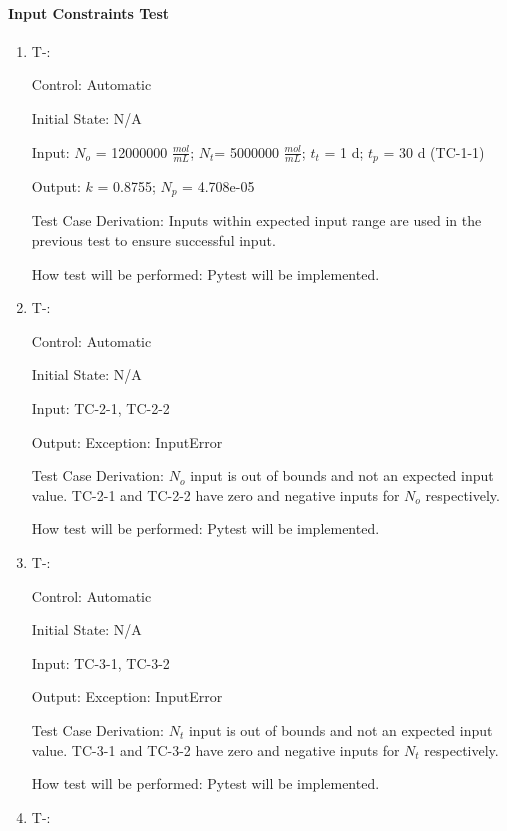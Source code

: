 \documentclass[12pt, titlepage]{article}
\newcounter{tinnum} %
\begin{document}
\paragraph{Input Constraints Test}

\begin{enumerate}

\item{T-}\thetinnum\label{T-1}:

Control: Automatic
					
Initial State: N/A
					
Input: $N_{o}$ = 12000000 $\frac{mol}{mL}$; $N_{t}$= 5000000 $\frac{mol}{mL}$; 
$t_{t}$ = 1 d; $t_{p}$ = 30 d (TC-1-1)
					
Output: $k$ = 0.8755; $N_p$ = 4.708e-05

Test Case Derivation: Inputs within expected input range are used in the 
previous test to ensure successful input.
					
How test will be performed: Pytest will be implemented.
					
\item{T-}\thetinnum\label{T-2}:

Control: Automatic
					
Initial State: N/A
					
Input: TC-2-1, TC-2-2
					
Output: Exception: InputError

Test Case Derivation: $N_{o}$ input is out of bounds and not an expected input 
value. TC-2-1 and TC-2-2 have zero and negative inputs for $N_{o}$  
respectively. 

How test will be performed: Pytest will be implemented.


\item{T-}\thetinnum\label{T-3}:

Control: Automatic
					
Initial State: N/A
					
Input: TC-3-1, TC-3-2
					
Output: Exception: InputError

Test Case Derivation: $N_{t}$ input is out of bounds and not an expected input 
value. TC-3-1 and TC-3-2 have zero and negative inputs for $N_{t}$ respectively. 

How test will be performed: Pytest will be implemented.


\item{T-}\thetinnum\label{T-4}:


\end{enumerate}
\end{document}
